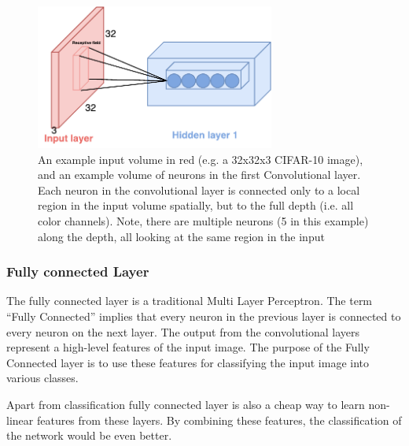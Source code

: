 \begin{figure}[H]
	\centering
	\includegraphics[width=0.7\textwidth]{Figures/Respective_field.pdf}
	\caption{An example input volume in red (e.g. a 32x32x3 CIFAR-10 image), and an example volume of neurons in the first Convolutional layer. Each neuron in the convolutional layer is connected only to a local region in the input volume spatially, but to the full depth (i.e. all color channels). Note, there are multiple neurons (5 in this example) along the depth, all looking at the same region in the input \cite{CNN_course}}
	\label{fig:Respective_field}
\end{figure}


\subsubsection*{Fully connected Layer }
The fully connected layer is a traditional Multi Layer Perceptron. The term “Fully Connected” implies that every neuron in the previous layer is connected to every neuron on the next layer. The output from the convolutional layers represent a high-level features of the input image. The purpose of the Fully Connected layer is to use these features for classifying the input image into various classes. 

Apart from classification fully connected layer is also a cheap way to learn non-linear features from these layers. By combining these features, the classification of the network would be even better. \cite{Fully_Connected_Layer}         